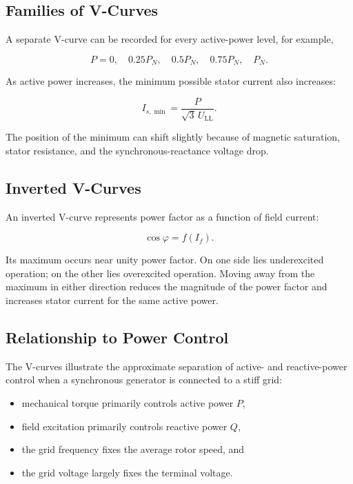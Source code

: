 \subsection{Families of V-Curves}

A separate V-curve can be recorded for every active-power level, for example,

\begin{equation}
  P=0,
  \quad 0.25P_N,
  \quad 0.5P_N,
  \quad 0.75P_N,
  \quad P_N.
\end{equation}

As active power increases, the minimum possible stator current also increases:

\begin{equation}
  I_{s,\min}
  =\frac{P}{\sqrt{3}\,U_{\mathrm{LL}}}.
\end{equation}

The position of the minimum can shift slightly because of magnetic saturation,
stator resistance, and the synchronous-reactance voltage drop.

\subsection{Inverted V-Curves}

An inverted V-curve represents power factor as a function of field current:

\begin{equation}
  \cos\varphi=f(I_f).
\end{equation}

Its maximum occurs near unity power factor. On one side lies underexcited
operation; on the other lies overexcited operation. Moving away from the
maximum in either direction reduces the magnitude of the power factor and
increases stator current for the same active power.

\subsection{Relationship to Power Control}

The V-curves illustrate the approximate separation of active- and
reactive-power control when a synchronous generator is connected to a stiff
grid:

\begin{itemize}
  \item mechanical torque primarily controls active power $P$,
  \item field excitation primarily controls reactive power $Q$,
  \item the grid frequency fixes the average rotor speed, and
  \item the grid voltage largely fixes the terminal voltage.
\end{itemize}

